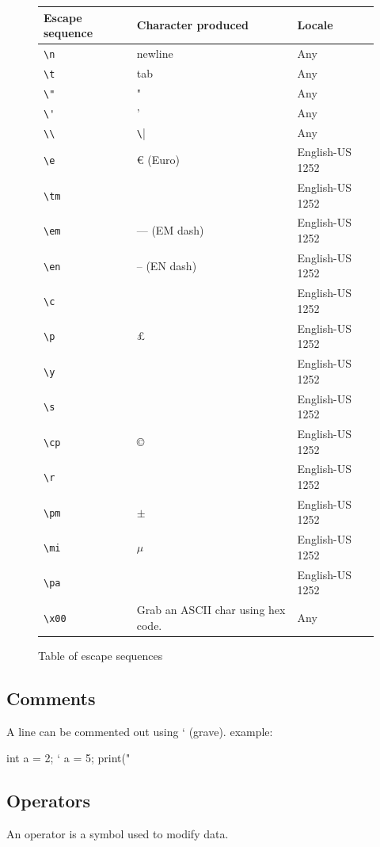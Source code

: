 \documentclass[12pt, letterpaper, oneside]{article}
\begin{document}
	\begin{figure}[h]
		\begin{tabular}{|p{3cm}|p{4cm}|p{3cm}|}
			\hline
			Escape sequence& Character produced& Locale\\
			\hline
			\verb|\n|&newline&Any\\
			\hline
			\verb|\t|&tab&Any\\
			\hline
			\verb|\"|&"&Any\\
			\hline
			\verb|\'|&'&Any\\
			\hline
			\verb|\\|&\verb|\|&Any\\
			\hline
			\verb|\e|&€ (Euro)&English-US 1252\\
			\hline
			\verb|\tm|&\texttrademark&English-US 1252\\
			\hline
			\verb|\em|& --- (EM dash)&English-US 1252\\
			\hline
			\verb|\en|& -- (EN dash)&English-US 1252\\
			\hline
			\verb|\c|&\textcent&English-US 1252\\
			\hline
			\verb|\p|&\pounds&English-US 1252\\
			\hline
			\verb|\y|&\textyen&English-US 1252\\
			\hline
			\verb|\s|&\textsection&English-US 1252\\
			\hline
			\verb|\cp|&\copyright&English-US 1252\\
			\hline
			\verb|\r|&\textregistered&English-US 1252\\
			\hline
			\verb|\pm|&$\pm$&English-US 1252\\
			\hline
			\verb|\mi|&$\mu$&English-US 1252\\
			\hline
			\verb|\pa|&\textparagraph&English-US 1252\\
			\hline
			\verb|\x00|&Grab an ASCII char using hex code.&Any\\
			\hline
		\end{tabular}
		\caption{Table of escape sequences}
		\label{fig:escp}
	\end{figure}
	\newpage
	\subsection{Comments}
	A line can be commented out using ` (grave).
	example:
	\begin{spverbatim}
		int a = 2; ` a = 5;
		print("%
	\end{spverbatim}
	\subsection{Operators}
	An operator is a symbol used to modify data.
\end{document}
